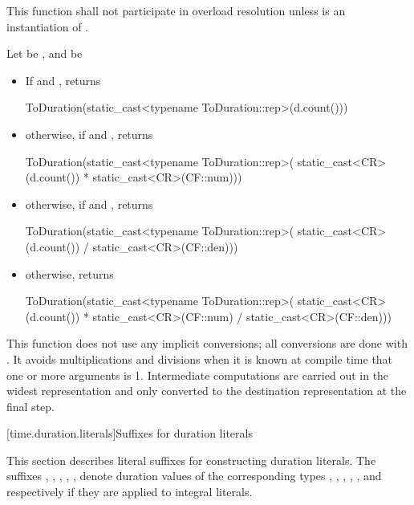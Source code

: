 \begin{itemdescr}
\pnum
\remarks This function shall not participate in overload
resolution unless  is an instantiation of .

\pnum
\returns Let  be , and  be  
\begin{itemize}
\item If  and , returns
\begin{codeblock}
ToDuration(static_cast<typename ToDuration::rep>(d.count()))
\end{codeblock}

\item otherwise, if  and , returns
\begin{codeblock}
ToDuration(static_cast<typename ToDuration::rep>(
  static_cast<CR>(d.count()) * static_cast<CR>(CF::num)))
\end{codeblock}

\item otherwise, if  and , returns
\begin{codeblock}
ToDuration(static_cast<typename ToDuration::rep>(
  static_cast<CR>(d.count()) / static_cast<CR>(CF::den)))
\end{codeblock}

\item otherwise, returns
\begin{codeblock}
ToDuration(static_cast<typename ToDuration::rep>(
  static_cast<CR>(d.count()) * static_cast<CR>(CF::num) / static_cast<CR>(CF::den)))
\end{codeblock}
\end{itemize}

\realnotes This function does not use any implicit conversions; all conversions
are done with . It avoids multiplications and divisions when
it is known at compile time that one or more arguments is 1. Intermediate
computations are carried out in the widest representation and only converted to
the destination representation at the final step.
\end{itemdescr}

[time.duration.literals]{Suffixes for duration literals}

\pnum
This section describes literal suffixes for constructing duration literals. The
suffixes , , , , , 
denote duration values of the corresponding types , ,
, , , and 
respectively if they are applied to integral literals.

